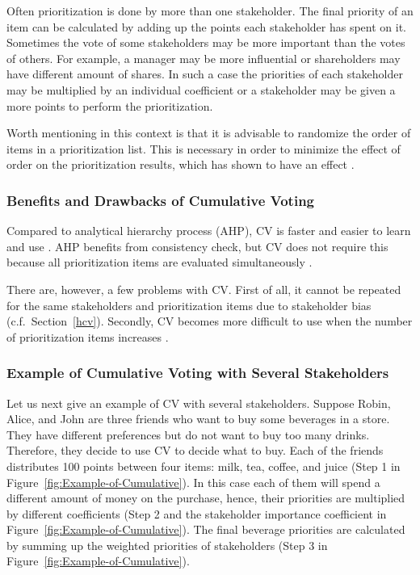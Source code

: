 Often prioritization is done by more than one stakeholder. The final
priority of an item can be calculated by adding up the points each stakeholder
has spent on it. Sometimes the vote of some stakeholders may be more
important than the votes of others. For example, a manager may be
more influential or shareholders may have different
amount of shares. In such a case the priorities of each stakeholder
may be multiplied by an individual coefficient or a stakeholder may be given a 
more points to perform the prioritization.

Worth mentioning in this context is that it is advisable to randomize 
the order of items in a prioritization list. This is necessary in order 
to minimize the effect of order on the prioritization
results, which has shown to have an effect \cite{Svahnberg2009}.

\subsubsection{Benefits and Drawbacks of Cumulative Voting}
Compared to analytical hierarchy process (AHP), CV is faster and easier to 
learn and use \cite{Berander2005,Ahl2005}.
AHP benefits from consistency check, but CV does not require this because
all prioritization items are evaluated simultaneously \cite{Ahl2005}.

There are, however, a few problems with CV. First of all, it cannot be repeated for the
same stakeholders and prioritization items due to stakeholder bias
\cite{Leffingwell1999} (c.f.\ Section~\ref{hcv}). Secondly, CV 
becomes more difficult to use when the number of prioritization items 
increases \cite{Berander2009a}.

\subsubsection{Example of Cumulative Voting with Several Stakeholders}

Let us next give an example of CV with several stakeholders. Suppose Robin,
Alice, and John are three friends who want to buy some beverages in
a store. They have different preferences but do not want to buy too
many drinks. Therefore, they decide to use CV to decide what to buy.
Each of the friends distributes 100 points between four items: milk,
tea, coffee, and juice (Step 1 in Figure~\ref{fig:Example-of-Cumulative}).
In this case each of them will spend a different amount of money on the purchase,
hence, their priorities are multiplied by different coefficients
(Step 2 and the stakeholder importance coefficient in Figure~\ref{fig:Example-of-Cumulative}).
The final beverage priorities are calculated by summing up the weighted priorities
of stakeholders (Step 3 in Figure~\ref{fig:Example-of-Cumulative}).

